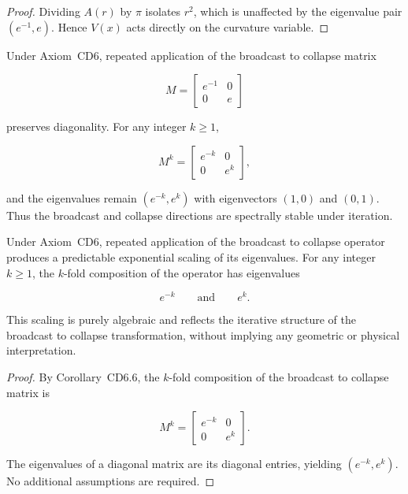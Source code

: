 \documentclass[final,onefignum,onetabnum]{siamart}
\begin{document}
\begin{proof}
Dividing $A(r)$ by $\pi$ isolates $r^{2}$, which is unaffected by the eigenvalue pair $(e^{-1}, e)$. Hence $V(x)$ acts directly on the curvature variable.
\end{proof}

\begin{corollary}
Under Axiom~CD6, repeated application of the broadcast to collapse matrix

\[
M =
\begin{bmatrix}
e^{-1} & 0 \\
0 & e
\end{bmatrix}
\]

preserves diagonality. For any integer $k \ge 1$,

\[
M^{k} =
\begin{bmatrix}
e^{-k} & 0 \\
0 & e^{k}
\end{bmatrix},
\]

and the eigenvalues remain $(e^{-k}, e^{k})$ with eigenvectors $(1,0)$ and $(0,1)$. Thus the broadcast and collapse directions are spectrally stable under iteration.
\end{corollary}

\begin{corollary}
Under Axiom~CD6, repeated application of the broadcast to collapse operator produces a predictable exponential scaling of its eigenvalues. For any integer $k \ge 1$, the $k$-fold composition of the operator has eigenvalues


\[
e^{-k} \qquad \text{and} \qquad e^{k}.
\]


This scaling is purely algebraic and reflects the iterative structure of the broadcast to collapse transformation, without implying any geometric or physical interpretation.
\end{corollary}

\begin{proof}
By Corollary~CD6.6, the $k$-fold composition of the broadcast to collapse matrix is


\[
M^{k} =
\begin{bmatrix}
e^{-k} & 0 \\
0 & e^{k}
\end{bmatrix}.
\]


The eigenvalues of a diagonal matrix are its diagonal entries, yielding $(e^{-k}, e^{k})$. No additional assumptions are required.
\end{proof}
\end{document}
